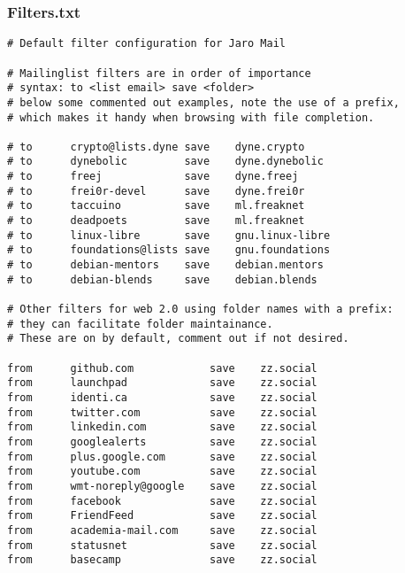 \documentclass[a4,onecolumn,portrait]{article}
\begin{document}
\subsubsection{Filters.txt}
\label{sec-13-1-2}

\begin{verbatim}
# Default filter configuration for Jaro Mail

# Mailinglist filters are in order of importance
# syntax: to <list email> save <folder>
# below some commented out examples, note the use of a prefix,
# which makes it handy when browsing with file completion.

# to	  crypto@lists.dyne	save	dyne.crypto
# to	  dynebolic		    save	dyne.dynebolic
# to	  freej			    save	dyne.freej
# to	  frei0r-devel		save	dyne.frei0r
# to	  taccuino		    save	ml.freaknet
# to	  deadpoets		    save	ml.freaknet
# to	  linux-libre		save	gnu.linux-libre
# to	  foundations@lists	save	gnu.foundations
# to	  debian-mentors	save	debian.mentors
# to	  debian-blends		save	debian.blends

# Other filters for web 2.0 using folder names with a prefix:
# they can facilitate folder maintainance.
# These are on by default, comment out if not desired.

from      github.com            save	zz.social
from      launchpad	            save	zz.social
from      identi.ca             save	zz.social
from      twitter.com		    save	zz.social
from      linkedin.com		    save	zz.social
from      googlealerts		    save	zz.social
from      plus.google.com	    save	zz.social
from      youtube.com		    save	zz.social
from      wmt-noreply@google	save	zz.social
from      facebook		        save	zz.social
from      FriendFeed		    save	zz.social
from      academia-mail.com	    save	zz.social
from      statusnet		        save	zz.social
from      basecamp		        save	zz.social
\end{verbatim}
\end{document}
